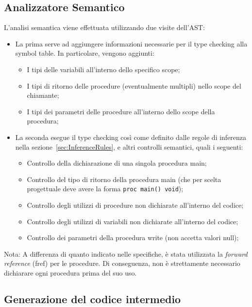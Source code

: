 \documentclass[a4paper,12pt]{article}
\begin{document}
	\subsection{Analizzatore Semantico}
	L'analisi semantica viene effettuata utilizzando due visite dell'AST:
	\begin{itemize}
		\item La prima serve ad aggiungere informazioni necessarie per il type checking alla symbol table. In particolare, vengono aggiunti:
			\begin{itemize}
				\item I tipi delle variabili all'interno dello specifico scope;
				\item I tipi di ritorno delle procedure (eventualmente multipli) nello scope del chiamante;
				\item I tipi dei parametri delle procedure all'interno dello scope della procedura;
			\end{itemize}

		\item La seconda esegue il type checking così come definito dalle regole di inferenza nella sezione~\ref{sec:InferenceRules},
		      e altri controlli semantici, quali i seguenti:
			\begin{itemize}
				\item Controllo della dichiarazione di una singola procedura main;
				\item Controllo del tipo di ritorno della procedura main (che per scelta progettuale 
					  deve avere la forma \texttt{proc main() void});
				\item Controllo degli utilizzi di procedure non dichiarate all'interno del codice;
				\item Controllo degli utilizzi di variabili non dichiarate all'interno del codice;
				\item Controllo dei parametri della procedura write (non accetta valori null);
			\end{itemize}
	\end{itemize}
	
	Nota: A differenza di quanto indicato nelle specifiche, è stata utilizzata la \textit{forward reference} (fref) per le procedure. 
	Di conseguenza, non è strettamente necessario dichiarare ogni procedura prima del suo uso.\newpage

	\subsection{Generazione del codice intermedio}
\end{document}

